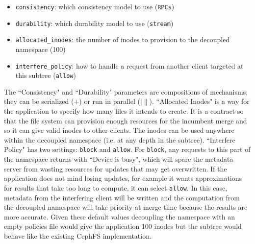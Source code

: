 \begin{itemize}

  \item \texttt{consistency}: which consistency model to use (\texttt{RPCs})

  \item \texttt{durability}: which durability model to use (\texttt{stream})

  \item \texttt{allocated\_inodes}: the number of inodes to provision to the
  decoupled namespace (100)

  \item \texttt{interfere\_policy}: how to handle a request from another
  client targeted at this subtree (\texttt{allow})

\end{itemize}

The ``Consistency" and ``Durability" parameters are compositions of mechanisms;
they can be serialized (\(+\)) or run in parallel (\(|\|\)).  ``Allocated
Inodes" is a way for the application to specify how many files it intends to
create. It is a contract so that the file system can provision enough resources
for the incumbent merge and so it can give valid inodes to other clients. The
inodes can be used anywhere within the decoupled namespace ({i.e.} at any depth
in the subtree).  ``Interfere Policy" has two settings: \texttt{block} and
\texttt{allow}.  For \texttt{block}, any requests to this part of the namespace
returns with ``Device is busy", which will spare the metadata server from
wasting resources for updates that may get overwritten. If the application does
not mind losing updates, for example it wants approximations for results that
take too long to compute, it can select \texttt{allow}. In this case, metadata
from the interfering client will be written and the computation from the
decoupled namespace will take priority at merge time because the results are
more accurate.  Given these default values decoupling the namespace with an
empty policies file would give the application 100 inodes but the subtree would
behave like the existing CephFS implementation.  
